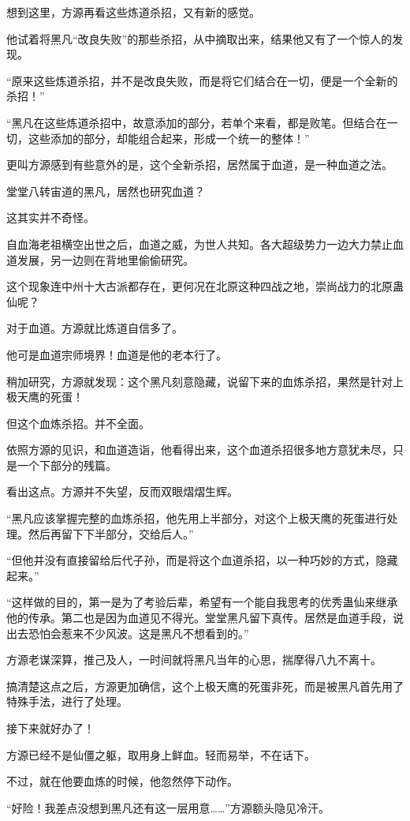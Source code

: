 \begin{this_body}
想到这里，方源再看这些炼道杀招，又有新的感觉。

他试着将黑凡“改良失败”的那些杀招，从中摘取出来，结果他又有了一个惊人的发现。

“原来这些炼道杀招，并不是改良失败，而是将它们结合在一切，便是一个全新的杀招！”

“黑凡在这些炼道杀招中，故意添加的部分，若单个来看，都是败笔。但结合在一切，这些添加的部分，却能组合起来，形成一个统一的整体！”

更叫方源感到有些意外的是，这个全新杀招，居然属于血道，是一种血道之法。

堂堂八转宙道的黑凡，居然也研究血道？

这其实并不奇怪。

自血海老祖横空出世之后，血道之威，为世人共知。各大超级势力一边大力禁止血道发展，另一边则在背地里偷偷研究。

这个现象连中州十大古派都存在，更何况在北原这种四战之地，崇尚战力的北原蛊仙呢？

对于血道。方源就比炼道自信多了。

他可是血道宗师境界！血道是他的老本行了。

稍加研究，方源就发现：这个黑凡刻意隐藏，说留下来的血炼杀招，果然是针对上极天鹰的死蛋！

但这个血炼杀招。并不全面。

依照方源的见识，和血道造诣，他看得出来，这个血道杀招很多地方意犹未尽，只是一个下部分的残篇。

看出这点。方源并不失望，反而双眼熠熠生辉。

“黑凡应该掌握完整的血炼杀招，他先用上半部分，对这个上极天鹰的死蛋进行处理。然后再留下下半部分，交给后人。”

“但他并没有直接留给后代子孙，而是将这个血道杀招，以一种巧妙的方式，隐藏起来。”

“这样做的目的，第一是为了考验后辈，希望有一个能自我思考的优秀蛊仙来继承他的传承。第二也是因为血道见不得光。堂堂黑凡留下真传。居然是血道手段，说出去恐怕会惹来不少风波。这是黑凡不想看到的。”

方源老谋深算，推己及人，一时间就将黑凡当年的心思，揣摩得八九不离十。

搞清楚这点之后，方源更加确信，这个上极天鹰的死蛋非死，而是被黑凡首先用了特殊手法，进行了处理。

接下来就好办了！

方源已经不是仙僵之躯，取用身上鲜血。轻而易举，不在话下。

不过，就在他要血炼的时候，他忽然停下动作。

“好险！我差点没想到黑凡还有这一层用意……”方源额头隐见冷汗。


\end{this_body}
